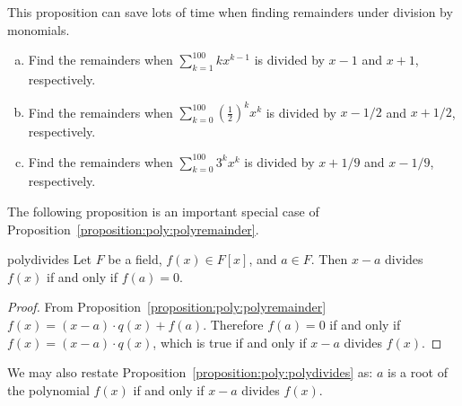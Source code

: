 This proposition can save lots of time when finding remainders under division by monomials.

\begin{exercise}{}
\begin{enumerate}[(a)]
\item
Find the remainders when $\sum_{k=1}^{100} k x^{k-1}$ is divided by $x-1$ and  $x+1$, respectively.
\item
Find the remainders when $\sum_{k=0}^{100} \left( \frac{1}{2} \right)^k x^k$ is divided by $x-1/2$ and $x+1/2$, respectively.
\item
Find the remainders when $\sum_{k=0}^{100} 3^k x^{k}$ is divided by $x+1/9$ and $x - 1/9$, respectively.
\end{enumerate}
\end{exercise}

The following proposition is an important special case of Proposition~\ref{proposition:poly:polyremainder}.

\begin{prop}{polydivides}
Let $F$ be a field, $f(x) \in F[x]$, and $a \in F$.  Then $x-a$ divides $f(x)$ if and only if $f(a) = 0$.
\end {prop}

\begin{proof}
From Proposition~\ref{proposition:poly:polyremainder} $f(x) = (x-a) \cdot q(x) + f(a)$. Therefore $f(a) = 0$ if and only if $f(x)=(x-a) \cdot q(x)$, which is true if and only if $x-a$ divides $f(x)$.
\end{proof}

We may also restate Proposition~\ref{proposition:poly:polydivides} as:  $a$ is a root of the polynomial $f(x)$ if and only if $x-a$ divides $f(x)$.

